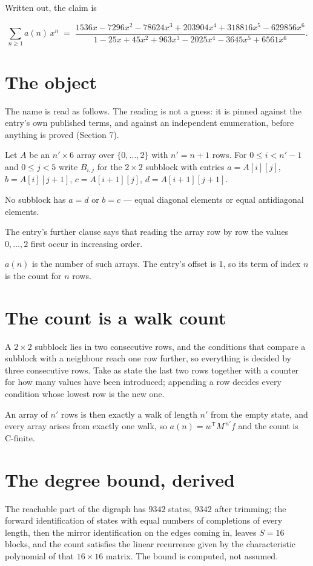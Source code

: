 \documentclass[11pt]{article}
\theoremstyle{definition}
\begin{document}
Written out, the claim is

\[\sum_{n \ge 1} a(n)\,x^n \;=\; \frac{1536x - 7296x^{2} - 78624x^{3} + 203904x^{4} + 318816x^{5} - 629856x^{6}}{1 - 25x + 45x^{2} + 963x^{3} - 2025x^{4} - 3645x^{5} + 6561x^{6}}.\]

\section{The object}

The name is read as follows. The reading is not a guess: it is pinned against the entry's own published terms, and against an independent enumeration, before anything is proved (Section 7).

Let $A$ be an $n' \times 6$ array over $\{0,\dots,2\}$ with $n' = n + 1$ rows. For $0 \le i < n'-1$ and $0 \le j < 5$ write $B_{i,j}$ for the $2\times2$ subblock with entries $a = A[i][j]$, $b = A[i][j{+}1]$, $c = A[i{+}1][j]$, $d = A[i{+}1][j{+}1]$.

No subblock has $a = d$ or $b = c$ --- equal diagonal elements or equal antidiagonal elements.

The entry's further clause says that reading the array row by row the values $0,\dots,2$ first occur in increasing order.

$a(n)$ is the number of such arrays. The entry's offset is 1, so its term of index $n$ is the count for $n$ rows.

\section{The count is a walk count}

A $2\times2$ subblock lies in two consecutive rows, and the conditions that compare a subblock with a neighbour reach one row further, so everything is decided by three consecutive rows. Take as state the last two rows together with a counter for how many values have been introduced; appending a row decides every condition whose lowest row is the new one.

An array of $n'$ rows is then exactly a walk of length $n'$ from the empty state, and every array arises from exactly one walk, so $a(n) = w^{\mathsf T}M^{\,n'}f$ and the count is C-finite.

\section{The degree bound, derived}

The reachable part of the digraph has $9342$ states, $9342$ after trimming; the forward identification of states with equal numbers of completions of every length, then the mirror identification on the edges coming in, leaves $S = 16$ blocks, and the count satisfies the linear recurrence given by the characteristic polynomial of that $16\times16$ matrix. The bound is computed, not assumed.
\end{document}
